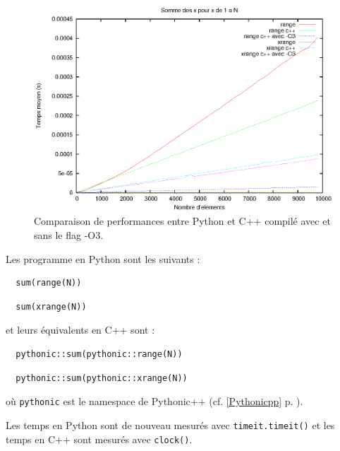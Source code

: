 \documentclass[a4paper]{article}
\begin{document}
\begin{figure}[h]
  \includegraphics[width=\textwidth]{./Pictures/RangeXrangePyCpp}
  \caption{Comparaison de performances entre Python et C++ compilé
    avec et sans le flag -O3.}
  \label{RangeXrangePyCpp}
\end{figure}

Les programme en Python sont les suivants :

\begin{lstlisting}
  sum(range(N))
\end{lstlisting}

\begin{lstlisting}
  sum(xrange(N))
\end{lstlisting}

et leurs équivalents en C++ sont :

\begin{lstlisting}
  pythonic::sum(pythonic::range(N))
\end{lstlisting}

\begin{lstlisting}
  pythonic::sum(pythonic::xrange(N))
\end{lstlisting}

où \texttt{pythonic} est le namespace de Pythonic++ (cf. \ref{Pythonicpp}
p. \pageref{Pythonicpp}).

Les temps en Python sont de nouveau mesurés avec \texttt{timeit.timeit()} et
les temps en C++ sont mesurés avec \texttt{clock()}.
\end{document}
